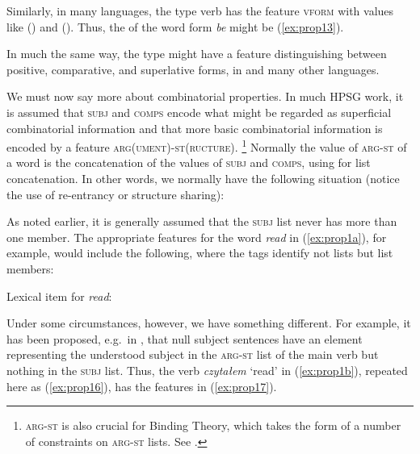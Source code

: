\documentclass[output=paper
	        ,collection
	        ,collectionchapter
 	        ,biblatex
                ,babelshorthands
                ,newtxmath
                ,draftmode
                ,colorlinks, citecolor=brown
]{langscibook}
\begin{document}
\ea\label{ex:prop12}
\z

\noindent
Similarly, in many languages, the type verb has the feature \textsc{vform} with values like
() and (). Thus, the \headv
of the word form \emph{be} might be (\ref{ex:prop13}).

\ea\label{ex:prop13}
\z

\noindent
In much the same way, the type  might have a feature distinguishing between positive, comparative, and superlative forms, in  and many other languages.

We must now say more about combinatorial properties. In much HPSG work, it is assumed that \textsc{subj} and \textsc{comps} encode what might be regarded as superficial combinatorial information and that more basic combinatorial information is encoded by a feature \textsc{arg(ument)-st(ructure)}.%
%
\footnote{\textsc{arg-st} is also crucial for Binding Theory, which takes the form of a number of constraints on \textsc{arg-st} lists. See .}
%
Normally the value of \textsc{arg-st} of a word is the concatenation of the values of \textsc{subj} and \textsc{comps}, using \isi{$\oplus$} for list concatenation. In other words, we normally have the following situation (notice the use of re-entrancy or structure sharing):

\ea\label{ex:prop14}
\z

\noindent
As noted earlier, it is generally assumed that the \textsc{subj} list never has more than one member. The appropriate features for the word \emph{read} in (\ref{ex:prop1a}), for example, would include the following, where the tags identify not lists but list members:

\eas
\label{ex:prop15}%
Lexical item for \emph{read}:\\
\zs

\noindent
Under some circumstances, however, we have something different. For example, it has been proposed, e.g.\ in \citet[65]{MS99a}, that null subject sentences have an element representing the understood subject in the \textsc{arg-st} list of the main verb but nothing in the \textsc{subj} list. Thus, the verb \emph{czytałem} `read' in (\ref{ex:prop1b}), repeated here as (\ref{ex:prop16}), has the features in (\ref{ex:prop17}).
\end{document}
